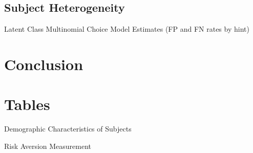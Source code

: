 \documentclass[12pt,a4paper]{article}
\begin{document}


\newpage
\singlespacing
\small

\subsection{Subject Heterogeneity}


\begin{table}[H]
\caption{Latent Class Multinomial Choice Model Estimates (FP and FN rates by hint)}

\end{table}

%










\section{Conclusion}


\clearpage





 
\appendix

\newpage
\section{Tables}


\begin{table}[h!]
\caption{Demographic Characteristics of Subjects} \label{summ_tab}

\end{table}

\begin{table}[h!]
\caption{Risk Aversion Measurement} \label{ra_tab}

\end{table}


\begin{table}[htbp!]

\end{table}


\begin{table}[hbp!]
 \label{ip_tab}
\end{table}

\begin{table}[h!]

\end{table}
\end{document}
